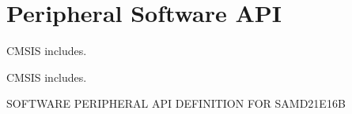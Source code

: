\hypertarget{group___s_a_m_d21_e16_b__api}{}\section{Peripheral Software A\+PI}
\label{group___s_a_m_d21_e16_b__api}


C\+M\+S\+IS includes.  


C\+M\+S\+IS includes. 

S\+O\+F\+T\+W\+A\+RE P\+E\+R\+I\+P\+H\+E\+R\+AL A\+PI D\+E\+F\+I\+N\+I\+T\+I\+ON F\+OR S\+A\+M\+D21\+E16B 